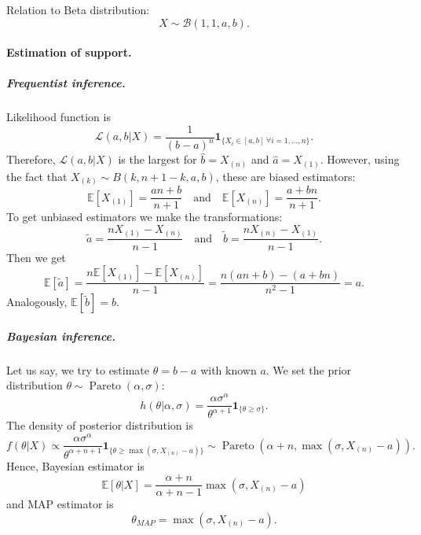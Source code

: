\documentclass[a4paper,11pt]{article}
\theoremstyle{plain}
\theoremstyle{definition}
\begin{document}
	Relation to Beta distribution: \[X \sim \mathcal{B}(1, 1, a, b). \]
	\paragraph{Estimation of support.}
	\subparagraph{Frequentist inference.} Likelihood function is
	\[
	\mathcal{L}(a, b | X) = \frac{1}{(b-a)^n} \mathbf{1}_{ \{ X_i \in [a, b] \ \forall i = 1, \dots, n \} }.
	\]
	Therefore, $\mathcal{L}(a, b | X)$ is the largest for $\hat{b} = X_{(n)}$ and $\hat{a} = X_{(1)}$. However, using the fact that $X_{(k)} \sim B(k, n+1-k, a, b)$, these are biased estimators:
	\[ \mathbb{E}[X_{(1)}] = \frac{an + b}{n+1} \quad \text{and} \quad \mathbb{E}[X_{(n)}] = \frac{a + bn}{n+1}.  \]
	To get unbiased estimators we make the transformations:
	\[ \tilde{a} = \frac{nX_{(1)} - X_{(n)} }{n-1} \quad \text{and} \quad  \tilde{b} = \frac{nX_{(n)} - X_{(1)} }{n-1}. \]
	Then we get
	\[ 
	\mathbb{E}[\tilde{a}] = \frac{n\mathbb{E}[X_{(1)}] - \mathbb{E}[X_{(n)}]}{n-1} = \frac{n(an+b)-(a+bn)}{n^2-1} = a.
	\]
	Analogously, $\mathbb{E}[\tilde{b}] = b$.
	\subparagraph{Bayesian inference.} Let us say, we try to estimate $\theta = b-a$ with known $a$. We set the prior distribution $\theta \sim \operatorname{Pareto}(\alpha, \sigma)$:
	\[
	h(\theta|\alpha, \sigma) = \frac{\alpha \sigma^\alpha}{\theta^{\alpha + 1}} \mathbf{1}_{\{\theta \geq \sigma\}}.
	\]
	The density of posterior distribution is
	\[
	f(\theta|X) \propto \frac{\alpha \sigma^\alpha}{\theta^{\alpha+n+1}} \mathbf{1}_{\{\theta \geq \max(\sigma, X_{(n)}-a) \}} \sim \operatorname{Pareto}(\alpha + n, \max(\sigma, X_{(n)}-a) ).
	\]
	Hence, Bayesian estimator is
	\[  
	\mathbb{E}[\theta|X] = \frac{\alpha + n}{\alpha + n - 1}\max(\sigma, X_{(n)}-a)
	\]
	and MAP estimator is
	\[
	\theta_{MAP} = \max(\sigma, X_{(n)}-a).
	\]
	
	\pagebreak
\end{document}
